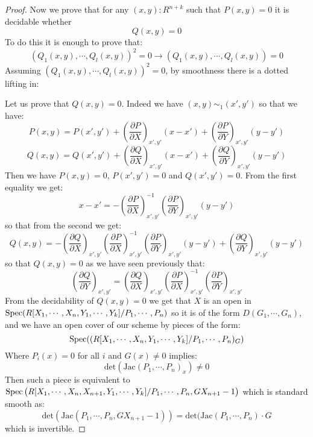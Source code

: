 \begin{proof}
Now we prove that for any $(x,y):R^{n+k}$ such that $P(x,y)=0$ it is decidable whether
\[Q(x,y)=0 \] 
To do this it is enough to prove that:
\[(Q_1(x,y),\cdots,Q_l(x,y))^2=0 \to (Q_1(x,y),\cdots,Q_l(x,y))=0\]
Assuming $(Q_1(x,y),\cdots,Q_l(x,y))^2=0$, by smoothness there is a dotted lifting in:
\begin{center}
\end{center}
Let us prove that $Q(x,y) = 0$. Indeed we have $(x,y) \sim_1 (x',y')$ so that we have:
\[P(x,y) = P(x',y')+ \left(\frac{\partial P}{\partial X}\right)_{x',y'}(x-x') + \left(\frac{\partial P}{\partial Y}\right)_{x',y'}(y-y') \]
\[Q(x,y) = Q(x',y')+ \left(\frac{\partial Q}{\partial X}\right)_{x',y'}(x-x') + \left(\frac{\partial Q}{\partial Y}\right)_{x',y'}(y-y') \]
Then we have $P(x,y) = 0$, $P(x',y')=0$ and $Q(x',y') = 0$. From the first equality we get:
\[x-x' =  -\left(\frac{\partial P}{\partial X}\right)_{x',y'}^{-1}\left(\frac{\partial P}{\partial Y}\right)_{x',y'}(y-y')\]
so that from the second we get:
\[Q(x,y) = -\left(\frac{\partial Q}{\partial X}\right)_{x',y'}\left(\frac{\partial P}{\partial X}\right)_{x',y'}^{-1}\left(\frac{\partial P}{\partial Y}\right)_{x',y'}(y-y') + \left(\frac{\partial Q}{\partial Y}\right)_{x',y'}(y-y')\]
so that $Q(x,y)=0$ as we have seen previously that:
\[\left(\frac{\partial Q}{\partial Y}\right)_{x',y'} = \left(\frac{\partial Q}{\partial X}\right)_{x',y'}\left(\frac{\partial P}{\partial X}\right)_{x',y'}^{-1} \left(\frac{\partial P}{\partial Y}\right)_{x',y'} \]
From the decidability of $Q(x,y)=0$ we get that $X$ is an open in $\operatorname{Spec}(R[X_1,\cdots,X_n,Y_1,\cdots,Y_k]/P_1,\cdots,P_n)$
so it is of the form $D(G_1,\cdots,G_n)$, and we have an open cover of our scheme by pieces of the form:
\[\operatorname{Spec}((R[X_1,\cdots,X_n,Y_1,\cdots,Y_k]/P_1,\cdots,P_n)_G)\]
Where $P_i(x)=0$ for all $i$ and $G(x)\not=0$ implies:
\[\mathrm{det}(\mathrm{Jac}(P_1,\cdots,P_n)_x)\not=0\]
Then such a piece is equivalent to $\operatorname{Spec}\big(R[X_1,\cdots,X_n,X_{n+1},Y_1,\cdots,Y_k] / P_1,\cdots,P_n,GX_{n+1}-1\big)$ which is standard smooth as:
\[\mathrm{det}(\mathrm{Jac}(P_1,\cdots,P_n,GX_{n+1}-1)) = \mathrm{det}(\mathrm{Jac}(P_1,\cdots,P_n) \cdot G\]
which is invertible.
\end{proof}

